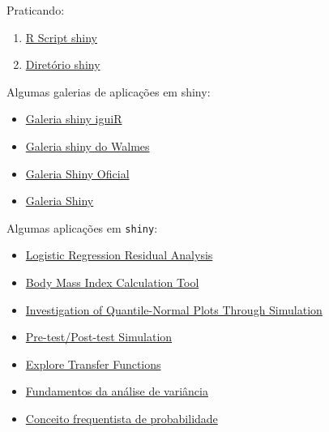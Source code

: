 \begin{frame}
  Praticando:
  \begin{enumerate}
  \item \href{run:./R/shiny/app.R}{R Script shiny}
  \item \href{run:./R/shiny/shiny}{Diretório shiny}
  \end{enumerate}

  \vspace{0.5cm} Algumas galerias de aplicações em shiny:

  \begin{itemize}
  \item \href{http://shiny.leg.ufpr.br/iguir/list/}{Galeria shiny iguiR}
  \item \href{http://shiny.leg.ufpr.br/walmes/list/}{Galeria shiny do
      Walmes}
  \item \href{http://shiny.rstudio.com/gallery/}{Galeria Shiny Oficial}
  \item \href{http://www.showmeshiny.com/}{Galeria Shiny}
  \end{itemize}
  
\end{frame}

\begin{frame}
  Algumas aplicações em \texttt{shiny}:
  \begin{itemize}
  \item \href{http://www.stat.cmu.edu:3838/hseltman/LogReg/}{Logistic
      Regression Residual Analysis}
  \item \href{https://ilame.shinyapps.io/Test3}{Body Mass Index
      Calculation Tool}
  \item
    \href{https://hseltman.shinyapps.io/QuantileNormal}{Investigation of
      Quantile-Normal Plots Through Simulation}
  \item
    \href{http://www.stat.cmu.edu:3838/hseltman/PrePost/}{
      Pre-test/Post-test Simulation}
  \item
    \href{http://www.stat.cmu.edu:3838/hseltman/TransferFunctions/}{
      Explore Transfer Functions}
  \item
    \href{http://nbcgib.uesc.br/lec/avale-es/amb-virtual/inferencia/anava}{
      Fundamentos da análise de variância}
  \item
    \href{http://nbcgib.uesc.br/lec/avale-es/amb-virtual/probabilidade/con-frequentista}{
      Conceito frequentista de probabilidade}
  \end{itemize}

\end{frame}
